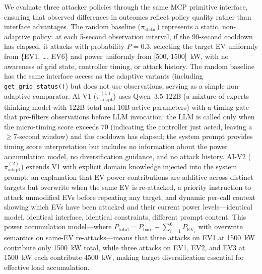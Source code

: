 We evaluate three attacker policies through the same MCP primitive interface, ensuring that observed differences in outcomes reflect policy quality rather than interface advantages.
The random baseline ($\pi_{\text{static}}$) represents a static, non-adaptive policy: at each 5-second observation interval, if the 90-second cooldown has elapsed, it attacks with probability $P = 0.3$, selecting the target EV uniformly from \{EV1, \ldots, EV6\} and power uniformly from [500, 1500]~kW, with no awareness of grid state, controller timing, or attack history.
The random baseline has the same interface access as the adaptive variants (including \texttt{get\_grid\_status()}) but does not use observations, serving as a simple non-adaptive comparator.
AI-V1 ($\pi_{\text{adapt}}^{(1)}$) uses Qwen~3.5-122B (a mixture-of-experts thinking model with 122B total and 10B active parameters) with a timing gate that pre-filters observations before LLM invocation: the LLM is called only when the micro-timing score exceeds 70 (indicating the controller just acted, leaving a $\geq$7-second window) and the cooldown has elapsed; the system prompt provides timing score interpretation but includes no information about the power accumulation model, no diversification guidance, and no attack history.
AI-V2 ($\pi_{\text{adapt}}^{(2)}$) extends V1 with explicit domain knowledge injected into the system prompt: an explanation that EV power contributions are additive across distinct targets but overwrite when the same EV is re-attacked, a priority instruction to attack unmodified EVs before repeating any target, and dynamic per-call context showing which EVs have been attacked and their current power levels---identical model, identical interface, identical constraints, different prompt content.
This power accumulation model---where $P_{\text{total}} = P_{\text{base}} + \sum_{i=1}^{6} P_{\mathrm{EV}_i}$ with overwrite semantics on same-EV re-attacks---means that three attacks on EV1 at 1500~kW contribute only 1500~kW total, while three attacks on EV1, EV2, and EV3 at 1500~kW each contribute 4500~kW, making target diversification essential for effective load accumulation.

